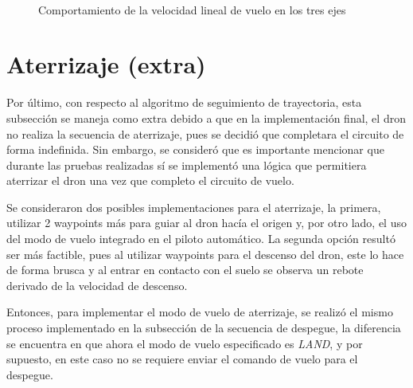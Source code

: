 \begin{figure}[ht]
    \centering
    \hfill
    \\
    \hfill

    \caption{Comportamiento de la velocidad lineal de vuelo en los tres ejes}
    \label{fig:pymav_missionv}
\end{figure}




\section{Aterrizaje (extra)}

Por último, con respecto al algoritmo de seguimiento de trayectoria, esta subsección se maneja como extra debido a que en la implementación final, el dron no realiza la secuencia de aterrizaje, pues se decidió que completara el circuito de forma indefinida. Sin embargo, se consideró que es importante mencionar que durante las pruebas realizadas sí se implementó una lógica que permitiera aterrizar el dron una vez que completo el circuito de vuelo. 

Se consideraron dos posibles implementaciones para el aterrizaje, la primera, utilizar 2 waypoints más para guiar al dron hacía el origen y, por otro lado, el uso del modo de vuelo integrado en el piloto automático. La segunda opción resultó ser más factible, pues al utilizar waypoints para el descenso del dron, este lo hace de forma brusca y al entrar en contacto con el suelo se observa un rebote derivado de la velocidad de descenso.

Entonces, para implementar el modo de vuelo de aterrizaje, se realizó el mismo proceso implementado en la subsección de la secuencia de despegue, la diferencia se encuentra en que ahora el modo de vuelo especificado es \textit{LAND}, y por supuesto, en este caso no se requiere enviar el comando de vuelo para el despegue.
